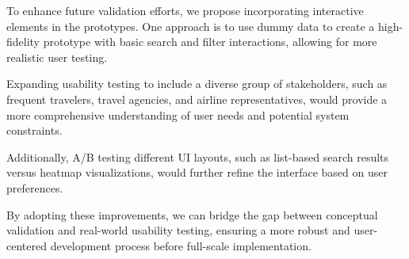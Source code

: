 To enhance future validation efforts, we propose incorporating interactive elements in the prototypes. One approach is to use dummy data to create a high-fidelity prototype with basic search and filter interactions, allowing for more realistic user testing.

Expanding usability testing to include a diverse group of stakeholders, such as frequent travelers, travel agencies, and airline representatives, would provide a more comprehensive understanding of user needs and potential system constraints.

Additionally, A/B testing different UI layouts, such as list-based search results versus heatmap visualizations, would further refine the interface based on user preferences.

By adopting these improvements, we can bridge the gap between conceptual validation and real-world usability testing, ensuring a more robust and user-centered development process before full-scale implementation.